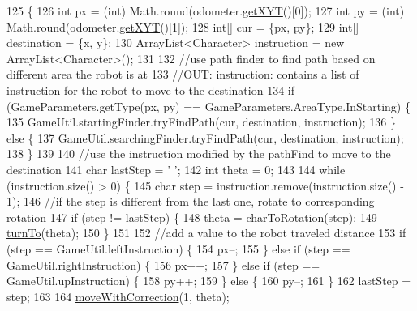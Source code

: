 \begin{DoxyCode}
125                                                                   \{
126     \textcolor{keywordtype}{int} px = (int) Math.round(odometer.\hyperlink{classca_1_1mcgill_1_1ecse211_1_1odometer_1_1_odometer_data_a8f40f0264c68f0cbed4fff1723ae7863}{getXYT}()[0]);
127     \textcolor{keywordtype}{int} py = (int) Math.round(odometer.\hyperlink{classca_1_1mcgill_1_1ecse211_1_1odometer_1_1_odometer_data_a8f40f0264c68f0cbed4fff1723ae7863}{getXYT}()[1]);
128     \textcolor{keywordtype}{int}[] cur = \{px, py\};
129     \textcolor{keywordtype}{int}[] destination = \{x, y\};
130     ArrayList<Character> instruction = \textcolor{keyword}{new} ArrayList<Character>();
131     
132     \textcolor{comment}{//use path finder to find path based on different area the robot is at}
133     \textcolor{comment}{//OUT: instruction: contains a list of instruction for the robot to move to the destination}
134     \textcolor{keywordflow}{if} (GameParameters.getType(px, py) == GameParameters.AreaType.InStarting) \{
135       GameUtil.startingFinder.tryFindPath(cur, destination, instruction);
136     \} \textcolor{keywordflow}{else} \{
137       GameUtil.searchingFinder.tryFindPath(cur, destination, instruction);
138     \}
139     
140     \textcolor{comment}{//use the instruction modified by the pathFind to move to the destination}
141     \textcolor{keywordtype}{char} lastStep = \textcolor{charliteral}{' '};
142     \textcolor{keywordtype}{int} theta = 0;
143     
144     \textcolor{keywordflow}{while} (instruction.size() > 0) \{
145       \textcolor{keywordtype}{char} step = instruction.remove(instruction.size() - 1);
146       \textcolor{comment}{//if the step is different from the last one, rotate to corresponding rotation}
147       \textcolor{keywordflow}{if} (step != lastStep) \{
148         theta = charToRotation(step);
149         \hyperlink{classca_1_1mcgill_1_1ecse211_1_1project_1_1_navigation_a3bbe0645f2b3b3d0986b4a707fb5a00c}{turnTo}(theta);
150       \}
151       
152       \textcolor{comment}{//add a value to the robot traveled distance}
153       \textcolor{keywordflow}{if} (step == GameUtil.leftInstruction) \{
154         px--;
155       \} \textcolor{keywordflow}{else} \textcolor{keywordflow}{if} (step == GameUtil.rightInstruction) \{
156         px++;
157       \} \textcolor{keywordflow}{else} \textcolor{keywordflow}{if} (step == GameUtil.upInstruction) \{
158         py++;
159       \} \textcolor{keywordflow}{else} \{
160         py--;
161       \}
162       lastStep = step;
163       
164       \hyperlink{classca_1_1mcgill_1_1ecse211_1_1project_1_1_navigation_a48eeb9ae2da23664421e8da5642054c7}{moveWithCorrection}(1, theta);

\end{DoxyCode}
